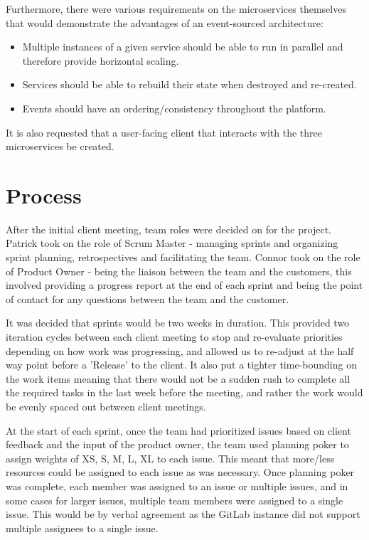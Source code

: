 \documentclass{l3proj}
\begin{document}
Furthermore, there were various requirements on the microservices themselves that would demonstrate the advantages of an event-sourced architecture:

\begin{itemize}
    \item Multiple instances of a given service should be able to run in parallel and therefore provide horizontal scaling.
    \item Services should be able to rebuild their state when destroyed and re-created.
    \item Events should have an ordering/consistency throughout the platform.
\end{itemize}

It is also requested that a user-facing client that interacts with the three microservices be created.

\section{Process}
\label{sec:process}
After the initial client meeting, team roles were decided on for the project. Patrick took on the role of Scrum Master - managing sprints and organizing sprint planning, retrospectives and facilitating the team. Connor took on the role of Product Owner - being the liaison between the team and the customers, this involved providing a progress report at the end of each sprint and being the point of contact for any questions between the team and the customer.

It was decided that sprints would be two weeks in duration. This provided two iteration cycles between each client meeting to stop and re-evaluate priorities depending on how work was progressing, and allowed us to re-adjust at the half way point before a 'Release' to the client. It also put a tighter time-bounding on the work items meaning that there would not be a sudden rush to complete all the required tasks in the last week before the meeting, and rather the work would be evenly spaced out between client meetings.

At the start of each sprint, once the team had prioritized issues based on client feedback and the input of the product owner, the team used planning poker to assign weights of XS, S, M, L, XL to each issue. This meant that more/less resources could be assigned to each issue as was necessary. Once planning poker was complete, each member was assigned to an issue or multiple issues, and in some cases for larger issues, multiple team members were assigned to a single issue. This would be by verbal agreement as the GitLab instance did not support multiple assignees to a single issue.
\end{document}
